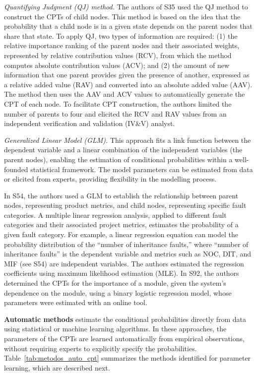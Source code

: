 \textit{Quantifying Judgment (QJ) method.} The authors of S35 used the QJ method to construct the CPTs of child nodes. This method is based on the idea that the probability that a child node is in a given state depends on the parent nodes that share that state. To apply QJ, two types of information are required: (1) the relative importance ranking of the parent nodes and their associated weights, represented by relative contribution values (RCV), from which the method computes absolute contribution values (ACV); and (2) the amount of new information that one parent provides given the presence of another, expressed as a relative added value (RAV) and converted into an absolute added value (AAV). The method then uses the AAV and ACV values to automatically generate the CPT of each node. To facilitate CPT construction, the authors limited the number of parents to four and elicited the RCV and RAV values from an independent verification and validation (IV\&V) analyst.

\textit{Generalized Linear Model (GLM).} This approach fits a link function between the dependent variable and a linear combination of the independent variables (the parent nodes), enabling the estimation of conditional probabilities within a well-founded statistical framework. The model parameters can be estimated from data or elicited from experts, providing flexibility in the modelling process.

In S54, the authors used a GLM to establish the relationship between parent nodes, representing product metrics, and child nodes, representing specific fault categories. A multiple linear regression analysis, applied to different fault categories and their associated project metrics, estimates the probability of a given fault category. For example, a linear regression equation can model the probability distribution of the ``number of inheritance faults,'' where ``number of inheritance faults'' is the dependent variable and metrics such as NOC, DIT, and MIF (see S54) are independent variables. The authors estimated the regression coefficients using maximum likelihood estimation (MLE). In S92, the authors determined the CPTs for the importance of a module, given the system's dependence on the module, using a binary logistic regression model, whose parameters were estimated with an online tool.

\textbf{Automatic methods} estimate the conditional probabilities directly from data using statistical or machine learning algorithms. In these approaches, the parameters of the CPTs are learned automatically from empirical observations, without requiring experts to explicitly specify the probabilities. Table~\ref{tab:metodos_auto_cpt} summarizes the methods identified for parameter learning, which are described next.

